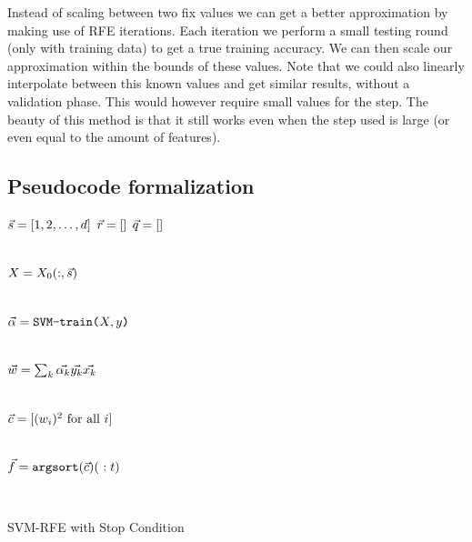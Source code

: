 Instead of scaling between two fix values we can get a better approximation by making use of RFE iterations. Each iteration we perform a small testing round (only with training data) to get a true training accuracy. We can then scale our approximation within the bounds of these values. Note that we could also linearly interpolate between this known values and get similar results, without a validation phase. This would however require small values for the step. The beauty of this method is that it still works even when the step used is large (or even equal to the amount of features).

\subsection{Pseudocode formalization}

\begin{algorithm}[H]
    \DontPrintSemicolon
      $\vec{s} = [1,2, \dotsc, d]$ 
      $\vec{r} = []$ 
      $\vec{q} = []$ 
        {
            \\
            $X=X_0(:,\vec{s})$\VS

            \\
            $\vec{\alpha} = \texttt{SVM-train(} X, y \texttt{)}$\VS

            \\
            $\vec{w} = \sum_k{\vec{\alpha_k} \vec{y_k} \vec{x_k}}$\VS

            \\
            $\vec{c} = [(w_i)^2 \text{ for all $i$}]$\VS

            \\
            $\vt{f} = \texttt{argsort}(\vt{c})(\ :t)$\VS

            \\
        }
    \caption{SVM-RFE with Stop Condition}
    \label{alg:svmrfe.stopcond}
\end{algorithm}\VS\VS

